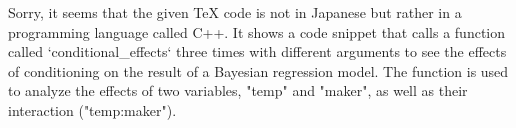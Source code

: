 Sorry, it seems that the given TeX code is not in Japanese but rather in a programming language called C++. It shows a code snippet that calls a function called `conditional_effects` three times with different arguments to see the effects of conditioning on the result of a Bayesian regression model. The function is used to analyze the effects of two variables, "temp" and "maker", as well as their interaction ("temp:maker").

